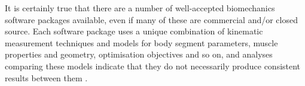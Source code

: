\documentclass[a4paper]{article}
\begin{document}
It is certainly true that there are a number of well-accepted biomechanics software packages available, even if many of these are commercial and/or closed source.
Each software package uses a unique combination of kinematic measurement techniques and models for body segment parameters, muscle properties and geometry, optimisation objectives and so on, and analyses comparing these models indicate that they do not necessarily produce consistent results between them \parencite{wagner2013-abe}.


\printbibliography
\end{document}
